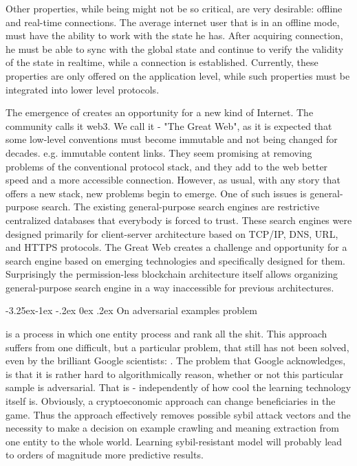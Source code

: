 \documentclass[8pt,oneside]{amsart}
\makeatletter
\newcommand{\linkgreen}[2]{\href{#1}{\color{green}{#2}}}
\renewcommand\subsection{\@startsection{subsection}{2}{\z@}%
                                     {-3.25ex\@plus -1ex \@minus -.2ex}%
                                     {0ex \@plus .2ex}%
                                     {\play\Large}}%
\newcommand{\titleSection}[1]{\subsection{#1}}
\makeatother
\begin{document}
Other properties, while being might not be so critical, are very desirable: offline and real-time connections. The average internet user that is in an offline mode, must have the ability to work with the state he has. After acquiring connection, he must be able to sync with the global state and continue to verify the validity of the state in realtime, while a connection is established. Currently, these properties are only offered on the application level, while such properties must be integrated into lower level protocols.

The emergence of \linkgreen{https://ipfs.io/ipfs/Qmf3eHU9idMUZgx6MKhCsFPWL24X9pDUi2ECqyH8UtBAMQ}{a new stack} creates an opportunity for a new kind of Internet. The community calls it web3. We call it - "The Great Web", as it is expected that some low-level conventions must become immutable and not being changed for decades. e.g. immutable content links. They seem promising at removing problems of the conventional protocol stack, and they add to the web better speed and a more accessible connection. However, as usual, with any story that offers a new stack, new problems begin to emerge. One of such issues is general-purpose search. The existing general-purpose search engines are restrictive centralized databases that everybody is forced to trust. These search engines were designed primarily for client-server architecture based on TCP/IP, DNS, URL, and HTTPS protocols. The Great Web creates a challenge and opportunity for a search engine based on emerging technologies and specifically designed for them. Surprisingly the permission-less blockchain architecture itself allows organizing general-purpose search engine in a way inaccessible for previous architectures.

\titleSection{On adversarial examples problem}\label{adversarial-examples}

\linkgreen{https://ipfs.io/ipfs/QmeS4LjoL1iMNRGuyYSx78RAtubTT2bioSGnsvoaupcHR6}{The conventional architecture of search engines} is a process in which one entity process and rank all the shit. This approach suffers from one difficult, but a particular problem, that still has not been solved, even by the brilliant Google scientists: \linkgreen{https://ipfs.io/ipfs/QmNrAFz34SLqkzhSg4wAYYJeokfJU5hBEpkT4hPRi226y9}{adversarial examples problem}. The problem that Google acknowledges, is that it is rather hard to algorithmically reason, whether or not this particular sample is adversarial. That is - independently of how cool the learning technology itself is. Obviously, a cryptoeconomic approach can change beneficiaries in the game. Thus the approach effectively removes possible sybil attack vectors and the necessity to make a decision on example crawling and meaning extraction from one entity to the whole world. Learning sybil-resistant model will probably lead to orders of magnitude more predictive results.
\end{document}
